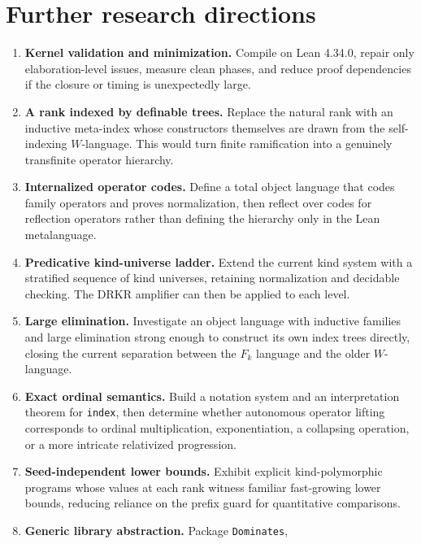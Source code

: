 \documentclass[11pt,oneside]{article}
\theoremstyle{definition}
\newcommand{\code}[1]{\texttt{#1}}
\begin{document}
\section{Further research directions}

\begin{enumerate}
  \item \textbf{Kernel validation and minimization.}  Compile on Lean 4.34.0,
        repair only elaboration-level issues, measure clean phases, and reduce
        proof dependencies if the closure or timing is unexpectedly large.
  \item \textbf{A rank indexed by definable trees.}  Replace the natural rank
        with an inductive meta-index whose constructors themselves are drawn
        from the self-indexing $W$-language.  This would turn finite
        ramification into a genuinely transfinite operator hierarchy.
  \item \textbf{Internalized operator codes.}  Define a total object language
        that codes family operators and proves normalization, then reflect over
        codes for reflection operators rather than defining the hierarchy only
        in the Lean metalanguage.
  \item \textbf{Predicative kind-universe ladder.}  Extend the current kind
        system with a stratified sequence of kind universes, retaining
        normalization and decidable checking.  The DRKR amplifier can then be
        applied to each level.
  \item \textbf{Large elimination.}  Investigate an object language with
        inductive families and large elimination strong enough to construct
        its own index trees directly, closing the current separation between
        the $F_k$ language and the older $W$-language.
  \item \textbf{Exact ordinal semantics.}  Build a notation system and an
        interpretation theorem for \code{index}, then determine whether
        autonomous operator lifting corresponds to ordinal multiplication,
        exponentiation, a collapsing operation, or a more intricate
        relativized progression.
  \item \textbf{Seed-independent lower bounds.}  Exhibit explicit
        kind-polymorphic programs whose values at each rank witness familiar
        fast-growing lower bounds, reducing reliance on the prefix guard for
        quantitative comparisons.
  \item \textbf{Generic library abstraction.}  Package \code{Dominates},

\end{enumerate}
\end{document}
